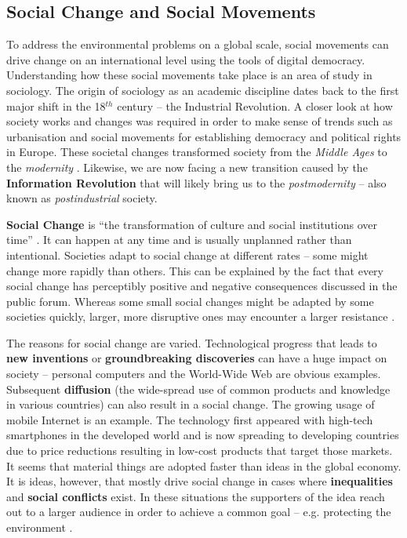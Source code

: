 \subsection{Social Change and Social Movements}
\label{subsec:socchange}
To address the environmental problems on a global scale, social movements can drive change on an international level using the tools of digital democracy. Understanding how these social movements take place is an area of study in sociology. The origin of sociology as an academic discipline dates back to the first major shift in the 18$^{th}$ century -- the Industrial Revolution. A closer look at how society works and changes was required in order to make sense of trends such as urbanisation and social movements for establishing democracy and political rights in Europe. These societal changes transformed society from the \textit{Middle Ages} to the \textit{modernity} \citep[pg. 9ff]{Macionis12}. Likewise, we are now facing a new transition caused by the \textbf{Information Revolution} that will likely bring us to the \textit{postmodernity} -- also known as \textit{postindustrial} society. \citep[pg. 564]{Macionis12} \par \vspace{0.2cm}

\textbf{Social Change} is ``the transformation of culture and social institutions over time'' \citep[pg. 565]{Macionis12}. It can happen at any time and is usually unplanned rather than intentional. Societies adapt to social change at different rates -- some might change more rapidly than others. This can be explained by the fact that every social change has perceptibly positive and negative consequences discussed in the public forum. Whereas some small social changes might be adapted by some societies quickly, larger, more disruptive ones may encounter a larger resistance \citep[pg. 565]{Macionis12}.\par\vspace{0.2cm}

The reasons for social change are varied. Technological progress that leads to \textbf{new inventions} or \textbf{groundbreaking discoveries} can have a huge impact on society -- personal computers and the World-Wide Web are obvious examples. Subsequent \textbf{diffusion} (the wide-spread use of common products and knowledge in various countries) can also result in a social change. The growing usage of mobile Internet is an example. The technology first appeared with high-tech smartphones in the developed world and is now spreading to developing countries due to price reductions resulting in low-cost products that target those markets. It seems that material things are adopted faster than ideas in the global economy. It is ideas, however, that mostly drive social change in cases where \textbf{inequalities} and \textbf{social conflicts} exist. In these situations the supporters of the idea reach out to a larger audience in order to achieve a common goal -- e.g. protecting the environment \citep[pg. 565f]{Macionis12}. \par \vspace{0.2cm}

